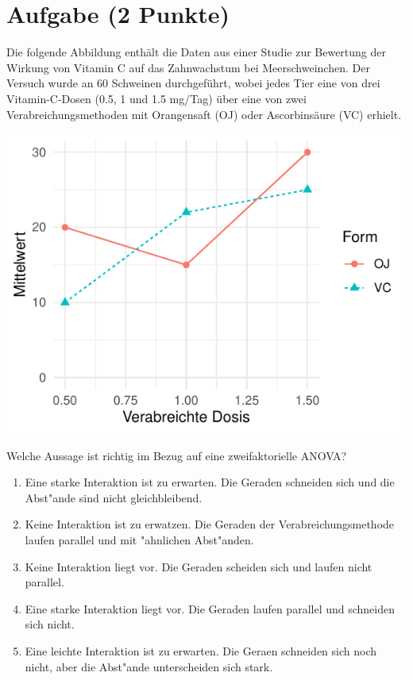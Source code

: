 \documentclass[a4paper, 10pt]{scrartcl}\usepackage[]{graphicx}\usepackage[]{xcolor}
\makeatletter
\def\maxwidth{ %
  \ifdim\Gin@nat@width>\linewidth
    \linewidth
  \else
    \Gin@nat@width
  \fi
}
\makeatother
\begin{document}
\section{Aufgabe \hfill (2 Punkte)}

Die folgende Abbildung enth{\"a}lt die Daten aus einer Studie zur
Bewertung der Wirkung von Vitamin C auf das Zahnwachstum bei
Meerschweinchen. Der Versuch wurde an 60 Schweinen durchgef{\"u}hrt, wobei
jedes Tier eine von drei Vitamin-C-Dosen (0.5, 1 und 1.5 mg/Tag) {\"u}ber eine
von zwei Verabreichungsmethoden mit Orangensaft (OJ)  oder
Ascorbins{\"a}ure (VC) erhielt. 



{\centering \includegraphics[width=\maxwidth]{img/mc-anova-02-a-1} 

}




Welche Aussage ist richtig im Bezug auf eine zweifaktorielle ANOVA?



\begin{enumerate}
\item [\textbf{A} \msquare] Eine starke Interaktion ist zu erwarten. Die Geraden schneiden sich und die Abst{"a}nde sind nicht gleichbleibend.
\item [\textbf{B} \msquare] Keine Interaktion ist zu erwatzen. Die Geraden der Verabreichungsmethode laufen parallel und mit {"a}hnlichen Abst{"a}nden.
\item [\textbf{C} \msquare] Keine Interaktion liegt vor. Die Geraden scheiden sich und laufen nicht parallel.
\item [\textbf{D} \msquare] Eine starke Interaktion liegt vor. Die Geraden laufen parallel und schneiden sich nicht.
\item [\textbf{E} \msquare] Eine leichte Interaktion ist zu erwarten. Die Geraen schneiden sich noch nicht, aber die Abst{"a}nde unterscheiden sich stark.
\end{enumerate} 
\end{document}
